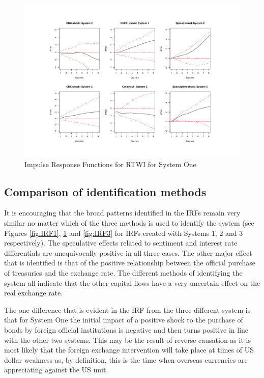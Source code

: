\documentclass[12pt, a4paper, oneside]{article}\usepackage[]{graphicx}\usepackage[]{color}
\begin{document}
 
\begin{landscape}
\begin{figure}[t]
\graphicspath{{Pictures/C2/}}
\centering
\caption{Impulse Response Functions for RTWI for System One}
\label{fig:IRF2}  
\includegraphics[scale=0.8]{IRF1}
\end{figure}
\end{landscape}

\subsection{Comparison of identification methods}
It is encouraging that the broad patterns identified in the IRFs remain very similar no matter which of the three methods is used to identify the system (see Figures \ref{fig:IRF1}, \ref{fig:IRF2} and \ref{fig:IRF3} for IRFs created with Systems 1, 2 and 3 respectively).  The speculative effects related to sentiment and interest rate differentials are unequivocally positive in all three cases. The other major effect that is identified is that of the positive relationship between the official purchase of treasuries and the exchange rate.  The different methods of identifying the system all indicate that the other capital flows have a very uncertain effect on the real exchange rate.  

The one difference that is evident in the IRF from the three different system is that for System One the initial impact of a positive shock to the purchase of bonds by foreign official institutions is negative and then turns positive in line with the other two systems.  This may be the result of reverse causation as it is most likely that the foreign exchange intervention will take place at times of US dollar weakness as, by definition, this is the time when overseas currencies are appreciating against the US unit. 
\end{document}

